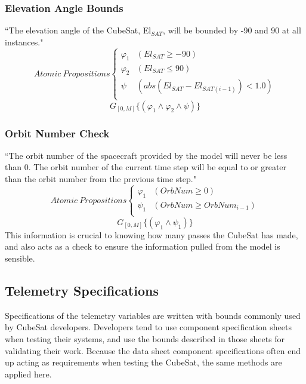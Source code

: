 \documentclass[conf]{new-aiaa}
\begin{document}
\subsubsection{\textbf{Elevation Angle Bounds}}
“The elevation angle of the CubeSat, El$_{SAT}$, will be bounded by -90 and 90 at all instances."
\[ Atomic\:Propositions \begin{cases}
  \varphi_1 & (El_{SAT} \geq -90) \\
  \varphi_2 & (El_{SAT} \leq 90) \\
  \psi & (abs(El_{SAT} - El_{SAT(i-1)}) < 1.0) \\
\end{cases} \]
\begin{equation}
    \label{Spec 3}
    G_{[0,M]} \{(\varphi_1 \wedge \varphi_2 \wedge \psi)\}
\end{equation} 

\subsubsection{\textbf{Orbit Number Check}}
“The orbit number of the spacecraft provided by the model will never be less than 0. The orbit number of the current time step will be equal to or greater than the orbit number from the previous time step."
\[ Atomic\:Propositions \begin{cases}
  \varphi_1 & (OrbNum \geq 0) \\
  \psi_1 & (OrbNum \geq OrbNum_{i-1})\\
\end{cases} \]
\begin{equation}
    \label{Spec 4}
    G_{[0,M]} \{(\varphi_1 \wedge \psi_1)\}
\end{equation} 
This information is crucial to knowing how many passes the CubeSat has made, and also acts as a check to ensure the information pulled from the model is sensible.

\subsection{Telemetry Specifications}

Specifications of the telemetry variables are written with bounds commonly used by CubeSat developers. Developers tend to use component specification sheets when testing their systems, and use the bounds described in those sheets for validating their work. Because the data sheet component specifications often end up acting as requirements when testing the CubeSat, the same methods are applied here.%
\end{document}
